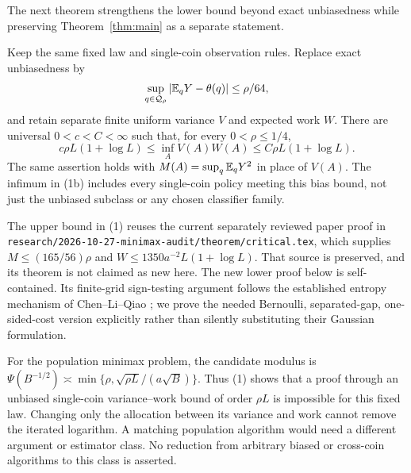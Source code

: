 The next theorem strengthens the lower bound beyond exact unbiasedness while
preserving Theorem~\ref{thm:main} as a separate statement.

\begin{theorem}\label{thm:bias}
Keep the same fixed law and single-coin observation rules. Replace exact
unbiasedness by
\[
 \sup_{q\in\mathcal Q_\rho}|\mathbb E_qY-\theta(q)|\le\rho/64,
\]
and retain separate finite uniform variance $V$ and expected work $W$.
There are universal $0<c<C<\infty$ such that, for every $0<\rho\le1/4$,
\[
 c\rho L(1+\log L)
 \le\inf_A V(A)W(A)
 \le C\rho L(1+\log L).                                 \tag{1b}
\]
The same assertion holds with $M(A)=\sup_q\mathbb E_qY^2$ in place of $V(A)$.
The infimum in (1b) includes every single-coin policy meeting this bias bound,
not just the unbiased subclass or any chosen classifier family.
\end{theorem}

The upper bound in (1) reuses the current separately reviewed paper proof in
\texttt{research/\allowbreak{}2026-10-27-minimax-audit/\allowbreak{}theorem/\allowbreak{}critical.tex}, which supplies
$M\le(165/56)\rho$ and $W\le1350a^{-2}L(1+\log L)$.
That source is preserved, and its theorem is not claimed as new here.
The new lower proof below is self-contained. Its finite-grid sign-testing
argument follows the established entropy mechanism of Chen--Li--Qiao
\cite[Lemma 4.1 and Appendix D]{clq}; we prove the needed Bernoulli,
separated-gap, one-sided-cost version explicitly rather than silently
substituting their Gaussian formulation.

For the population minimax problem, the candidate modulus is
$\Psi(B^{-1/2})\asymp\min\{\rho,\sqrt{\rho L}/(a\sqrt B)\}$.
Thus (1) shows that a proof through an unbiased single-coin variance--work
bound of order $\rho L$ is impossible for this fixed law. Changing only the
allocation between its variance and work cannot remove the iterated logarithm.
A matching population algorithm would need a different argument or estimator
class. No reduction from arbitrary biased or cross-coin algorithms to this
class is asserted.


